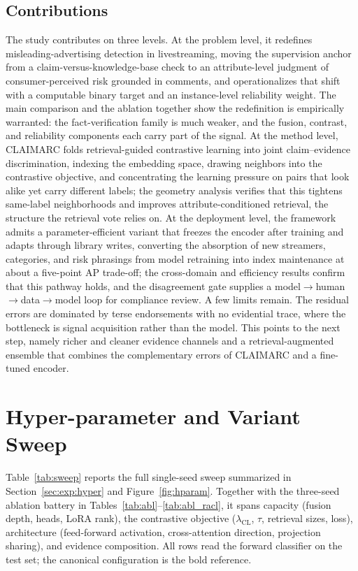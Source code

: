 \documentclass[11pt]{article}
\begin{document}
\subsection{Contributions}
\label{sec:concl:contrib}

The study contributes on three levels. At the problem level, it redefines
misleading-advertising detection in livestreaming, moving the supervision
anchor from a claim-versus-knowledge-base check to an attribute-level judgment
of consumer-perceived risk grounded in comments, and operationalizes that shift
with a computable binary target and an instance-level reliability weight. The
main comparison and the ablation together show the redefinition is empirically
warranted: the fact-verification family is much weaker, and the fusion,
contrast, and reliability components each carry part of the signal. At the method level, CLAIMARC
folds retrieval-guided contrastive learning into joint claim--evidence
discrimination, indexing the embedding space, drawing neighbors into the
contrastive objective, and concentrating the learning pressure on pairs that
look alike yet carry different labels; the geometry analysis verifies that this
tightens same-label neighborhoods and improves attribute-conditioned retrieval,
the structure the retrieval vote relies on. At the
deployment level, the framework admits a parameter-efficient variant that freezes
the encoder after training and adapts through library writes, converting the
absorption of new streamers, categories, and risk phrasings from model retraining
into index maintenance at about a five-point AP trade-off; the cross-domain and
efficiency results confirm that this pathway holds, and the disagreement gate
supplies a model$\to$human$\to$data$\to$model loop for compliance review. A few
limits remain. The residual errors are dominated by terse endorsements with no
evidential trace, where the bottleneck is signal acquisition rather than the
model. This points to the next step, namely richer and cleaner evidence channels and
a retrieval-augmented ensemble that combines the complementary errors of CLAIMARC
and a fine-tuned encoder.

\appendix
\section{Hyper-parameter and Variant Sweep}
\label{app:sweep}

Table~\ref{tab:sweep} reports the full single-seed sweep summarized in
Section~\ref{sec:exp:hyper} and Figure~\ref{fig:hparam}. Together with the
three-seed ablation battery in Tables~\ref{tab:abl}--\ref{tab:abl_racl}, it spans capacity (fusion depth, heads, LoRA rank), the
contrastive objective ($\lambda_{\mathrm{CL}}$, $\tau$, retrieval sizes, loss),
architecture (feed-forward activation, cross-attention direction, projection
sharing), and evidence composition. All rows read the forward classifier on the
test set; the canonical configuration is the bold reference.
\end{document}
